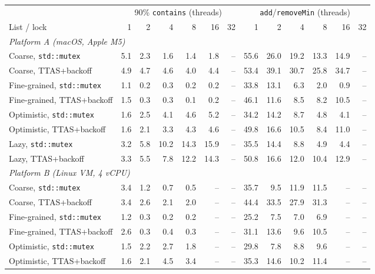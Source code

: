 \begin{tabular}{lrrrrrrrrrrrr}
\toprule
 & \multicolumn{6}{c}{90\% \texttt{contains} (threads)} & \multicolumn{6}{c}{\texttt{add}/\texttt{removeMin} (threads)} \\
\cmidrule(lr){2-7}\cmidrule(lr){8-13}
List / lock & 1 & 2 & 4 & 8 & 16 & 32 & 1 & 2 & 4 & 8 & 16 & 32 \\
\midrule
\multicolumn{13}{l}{\emph{Platform A (macOS, Apple M5)}} \\
Coarse, \texttt{std::mutex} & 5.1 & 2.3 & 1.6 & 1.4 & 1.8 & -- & 55.6 & 26.0 & 19.2 & 13.3 & 14.9 & -- \\
Coarse, TTAS+backoff & 4.9 & 4.7 & 4.6 & 4.0 & 4.4 & -- & 53.4 & 39.1 & 30.7 & 25.8 & 34.7 & -- \\
Fine-grained, \texttt{std::mutex} & 1.1 & 0.2 & 0.3 & 0.2 & 0.2 & -- & 33.8 & 13.1 & 6.3 & 2.0 & 0.9 & -- \\
Fine-grained, TTAS+backoff & 1.5 & 0.3 & 0.3 & 0.1 & 0.2 & -- & 46.1 & 11.6 & 8.5 & 8.2 & 10.5 & -- \\
Optimistic, \texttt{std::mutex} & 1.6 & 2.5 & 4.1 & 4.6 & 5.2 & -- & 34.2 & 14.2 & 8.7 & 4.8 & 4.1 & -- \\
Optimistic, TTAS+backoff & 1.6 & 2.1 & 3.3 & 4.3 & 4.6 & -- & 49.8 & 16.6 & 10.5 & 8.4 & 11.0 & -- \\
Lazy, \texttt{std::mutex} & 3.2 & 5.8 & 10.2 & 14.3 & 15.9 & -- & 35.5 & 14.4 & 8.8 & 4.9 & 4.4 & -- \\
Lazy, TTAS+backoff & 3.3 & 5.5 & 7.8 & 12.2 & 14.3 & -- & 50.8 & 16.6 & 12.0 & 10.4 & 12.9 & -- \\
\midrule
\multicolumn{13}{l}{\emph{Platform B (Linux VM, 4 vCPU)}} \\
Coarse, \texttt{std::mutex} & 3.4 & 1.2 & 0.7 & 0.5 & -- & -- & 35.7 & 9.5 & 11.9 & 11.5 & -- & -- \\
Coarse, TTAS+backoff & 3.4 & 2.6 & 2.1 & 2.0 & -- & -- & 44.4 & 33.5 & 27.9 & 31.3 & -- & -- \\
Fine-grained, \texttt{std::mutex} & 1.2 & 0.3 & 0.2 & 0.2 & -- & -- & 25.2 & 7.5 & 7.0 & 6.9 & -- & -- \\
Fine-grained, TTAS+backoff & 2.6 & 0.3 & 0.4 & 0.3 & -- & -- & 31.1 & 13.6 & 9.6 & 10.5 & -- & -- \\
Optimistic, \texttt{std::mutex} & 1.5 & 2.2 & 2.7 & 1.8 & -- & -- & 29.8 & 7.8 & 8.8 & 9.6 & -- & -- \\
Optimistic, TTAS+backoff & 1.6 & 2.1 & 4.5 & 3.4 & -- & -- & 35.3 & 14.6 & 10.2 & 11.4 & -- & -- \\

\end{tabular}
